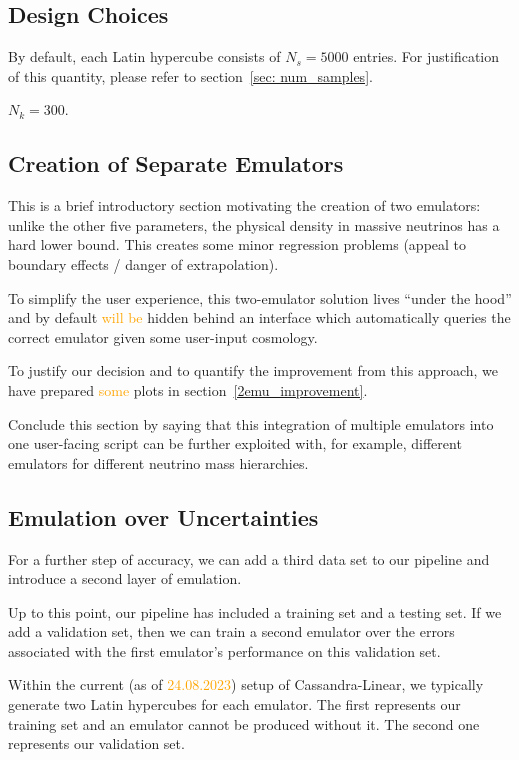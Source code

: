 \subsection{Design Choices}

By default, each Latin hypercube consists of $N_s = 5000$ entries. For 
justification of this quantity, please refer to
section~\ref{sec: num_samples}.

$N_k = 300$.

\subsection{Creation of Separate Emulators}

This is a brief introductory section motivating the creation of two emulators:
unlike the other five parameters, the physical density in massive neutrinos 
has a hard lower bound. This creates some minor regression problems (appeal to 
boundary effects / danger of extrapolation).

To simplify the user experience, this two-emulator solution lives ``under the
hood'' and by default \textcolor{orange}{will be} hidden behind an interface
which automatically queries the correct emulator given some user-input
cosmology.

To justify our decision and to quantify the improvement from this approach, we
have prepared \textcolor{orange}{some} plots in section~\ref{2emu_improvement}.

Conclude this section by saying that this integration of multiple emulators into one user-facing script can be further exploited with, for example, different emulators for different neutrino mass hierarchies.

\subsection{Emulation over Uncertainties}

For a further step of accuracy, we can add a third data set to our pipeline
and introduce a second layer of emulation.

Up to this point, our pipeline has included a training set and a testing set.
If we add a validation set, then we can train a second emulator over the
errors associated with the first emulator's performance on this validation
set.

Within the current (as of \textcolor{orange}{24.08.2023}) setup of
Cassandra-Linear, we typically generate two Latin hypercubes for each
emulator. The first represents our training set and an emulator cannot be
produced without it. The second one represents our validation set.

